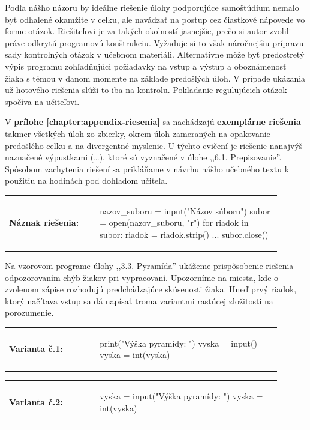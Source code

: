 Podľa nášho názoru by ideálne riešenie úlohy podporujúce samoštúdium nemalo byť odhalené okamžite v celku, ale navádzať na postup cez čiastkové nápovede vo forme otázok. Riešiteľovi je za takých okolností jasnejšie, prečo si autor zvolili práve odkrytú programovú konštrukciu. Vyžaduje si to však náročnejšiu prípravu sady kontrolných otázok v učebnom materiáli. Alternatívne môže byť predostretý výpis programu zohľadňujúci požiadavky na vstup a výstup a oboznámenosť žiaka s témou v danom momente na základe predošlých úloh. V prípade ukázania už hotového riešenia slúži to iba na kontrolu. Pokladanie regulujúcich otázok spočíva na učiteľovi.

V \textbf{prílohe \ref{chapter:appendix-riesenia}} sa nachádzajú \textbf{exemplárne riešenia} takmer všetkých úloh zo zbierky, okrem úloh zameraných na opakovanie predošlého celku a na divergentné myslenie. U týchto cvičení je riešenie nanajvýš naznačené výpustkami (\dots), ktoré sú vyznačené v úlohe ,,6.1. Prepisovanie''. Spôsobom zachytenia riešení sa prikláňame v návrhu nášho učebného textu k použitiu na hodinách pod dohľadom učiteľa.

\begin{tabular}{@{}p{0.3\linewidth}p{0.6\linewidth}}
\textbf{\small Náznak riešenia:} &
\vspace{-1em}
\begin{solution}
nazov_suboru = input("Názov súboru")
subor = open(nazov_suboru, "r")
for riadok in subor:
   riadok = riadok.strip()
   ...
subor.close()
\end{solution}
\end{tabular}

Na vzorovom programe úlohy ,,3.3. Pyramída'' ukážeme prispôsobenie riešenia odpozorovaním chýb žiakov pri vypracovaní. Upozorníme na miesta, kde o zvolenom zápise rozhodujú predchádzajúce skúsenosti žiaka. Hneď prvý riadok, ktorý načítava vstup sa dá napísať troma variantmi rastúcej zložitosti na porozumenie.

\begin{tabular}{@{}p{0.3\linewidth}p{0.6\linewidth}}
\textbf{\small Varianta č.1:} &
\vspace{-1em}
\begin{solution}
print("Výška pyramídy: ")
vyska = input()
vyska = int(vyska)
\end{solution}
\end{tabular}

\vspace{-2em}
\begin{tabular}{@{}p{0.3\linewidth}p{0.6\linewidth}}
\textbf{\small Varianta č.2:} &
\vspace{-1em}
\begin{solution}
vyska = input("Výška pyramídy: ")
vyska = int(vyska)
\end{solution}
\end{tabular}

